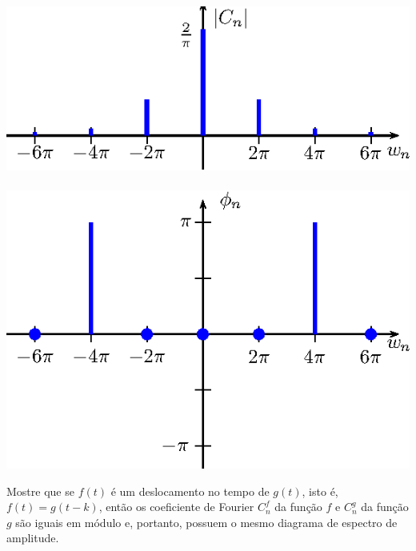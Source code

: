 \begin{resp}
\begin{itemize}
\includegraphics{cap_diagramas_espectro/pics/figura_23}~\includegraphics{cap_diagramas_espectro/pics/figura_24}

\end{itemize}
\end{resp}

\begin{exer} Mostre que se $f(t)$ é um deslocamento no tempo de $g(t)$, isto é, $f(t)=g(t-k)$, então os coeficiente de Fourier $C_n^f$ da função $f$ e $C_n^g$ da função $g$ são iguais em módulo e, portanto, possuem o mesmo diagrama de espectro de amplitude.
\end{exer}
